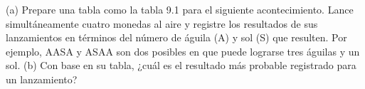 \item (a) Prepare una tabla como la tabla 9.1 para el siguiente acontecimiento. Lance simultáneamente cuatro monedas al aire y registre los resultados de sus lanzamientos en términos del número de águila (A) y sol (S) que resulten. Por ejemplo, AASA y ASAA son dos posibles en que puede lograrse tres águilas y un sol. (b) Con base en su tabla, ¿cuál es el resultado más probable registrado para un lanzamiento?

